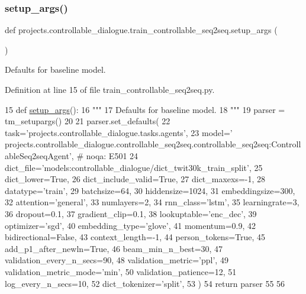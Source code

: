 \subsubsection{\texorpdfstring{setup\+\_\+args()}{setup\_args()}}
{\footnotesize\ttfamily def projects.\+controllable\+\_\+dialogue.\+train\+\_\+controllable\+\_\+seq2seq.\+setup\+\_\+args (\begin{DoxyParamCaption}{ }\end{DoxyParamCaption})}

\begin{DoxyVerb}Defaults for baseline model.
\end{DoxyVerb}
 

Definition at line 15 of file train\+\_\+controllable\+\_\+seq2seq.\+py.


\begin{DoxyCode}
15 \textcolor{keyword}{def }\hyperlink{namespaceprojects_1_1controllable__dialogue_1_1train__controllable__seq2seq_a493d97108e1bc85e7dee02310e5303ad}{setup\_args}():
16     \textcolor{stringliteral}{"""}
17 \textcolor{stringliteral}{    Defaults for baseline model.}
18 \textcolor{stringliteral}{    """}
19     parser = tm\_setupargs()
20 
21     parser.set\_defaults(
22         task=\textcolor{stringliteral}{'projects.controllable\_dialogue.tasks.agents'},
23         model=\textcolor{stringliteral}{'
      projects.controllable\_dialogue.controllable\_seq2seq.controllable\_seq2seq:ControllableSeq2seqAgent'},  \textcolor{comment}{# noqa: E501}
24         dict\_file=\textcolor{stringliteral}{'models:controllable\_dialogue/dict\_twit30k\_train\_split'},
25         dict\_lower=\textcolor{keyword}{True},
26         dict\_include\_valid=\textcolor{keyword}{True},
27         dict\_maxexs=-1,
28         datatype=\textcolor{stringliteral}{'train'},
29         batchsize=64,
30         hiddensize=1024,
31         embeddingsize=300,
32         attention=\textcolor{stringliteral}{'general'},
33         numlayers=2,
34         rnn\_class=\textcolor{stringliteral}{'lstm'},
35         learningrate=3,
36         dropout=0.1,
37         gradient\_clip=0.1,
38         lookuptable=\textcolor{stringliteral}{'enc\_dec'},
39         optimizer=\textcolor{stringliteral}{'sgd'},
40         embedding\_type=\textcolor{stringliteral}{'glove'},
41         momentum=0.9,
42         bidirectional=\textcolor{keyword}{False},
43         context\_length=-1,
44         person\_tokens=\textcolor{keyword}{True},
45         add\_p1\_after\_newln=\textcolor{keyword}{True},
46         beam\_min\_n\_best=30,
47         validation\_every\_n\_secs=90,
48         validation\_metric=\textcolor{stringliteral}{'ppl'},
49         validation\_metric\_mode=\textcolor{stringliteral}{'min'},
50         validation\_patience=12,
51         log\_every\_n\_secs=10,
52         dict\_tokenizer=\textcolor{stringliteral}{'split'},
53     )
54     \textcolor{keywordflow}{return} parser
55 
56 
\end{DoxyCode}


